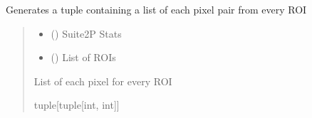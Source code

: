 \documentclass[letterpaper,10pt,english]{sphinxmanual}
\begin{document}
\begin{fulllineitems}
\label{\detokenize{Coloring:Coloring.generate_pixel_pairs}}
\pysigstartsignatures
{}
\pysigstopsignatures
\sphinxAtStartPar
Generates a tuple containing a list of each pixel pair from every ROI
\begin{quote}\begin{description}
\begin{itemize}
\item {} 
\sphinxAtStartPar
{} () \textendash{} Suite2P Stats

\item {} 
\sphinxAtStartPar
{} (\sphinxstyleliteralemphasis{\sphinxupquote{{[}}}\sphinxstyleliteralemphasis{\sphinxupquote{{]}}}) \textendash{} List of ROIs

\end{itemize}

\sphinxAtStartPar
List of each pixel for every ROI

\sphinxAtStartPar
tuple{[}tuple{[}int, int{]}{]}

\end{description}\end{quote}

\end{fulllineitems}

\end{document}
